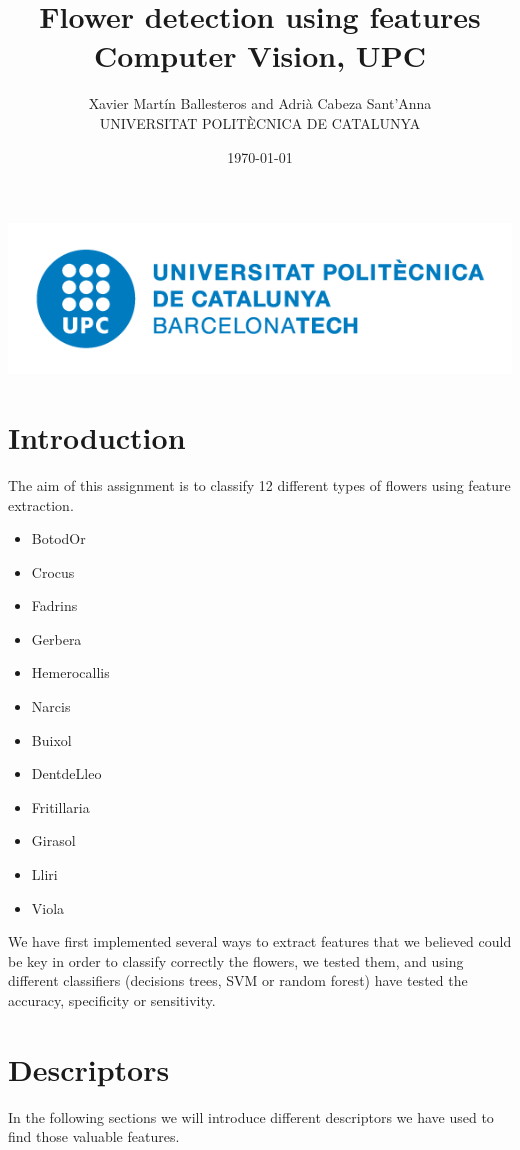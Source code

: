 \documentclass[11]{article}
\author{Xavier Martín Ballesteros and Adrià Cabeza Sant'Anna \\ \small UNIVERSITAT POLITÈCNICA DE CATALUNYA}
\title{Flower detection using features\\ \large{Computer Vision, UPC}}
\date{\today}
\begin{document}
\maketitle
\vspace*{\fill}
\includegraphics[scale=0.4]{UPClogo.png}\par\vspace{1cm}

\newpage
\tableofcontents
\newpage 

\section{Introduction}
The aim of this assignment is to classify 12 different types of flowers using feature extraction. 
\begin{multicols}{3}
\begin{itemize}
\item BotodOr 
\item Crocus  
\item Fadrins   
\item Gerbera 
\item Hemerocallis 
\item Narcis
\item Buixol
\item DentdeLleo 
\item Fritillaria  
\item Girasol 
\item Lliri     
\item Viola

\end{itemize}
\end{multicols}

We have first implemented several ways to extract features that we believed could be key in order to classify correctly the flowers, we tested them, and using different classifiers (decisions trees, SVM or random forest) have tested the accuracy, specificity or sensitivity. 

\section{Descriptors}
In the following sections we will introduce different descriptors we have used to find those valuable features.
\end{document}
